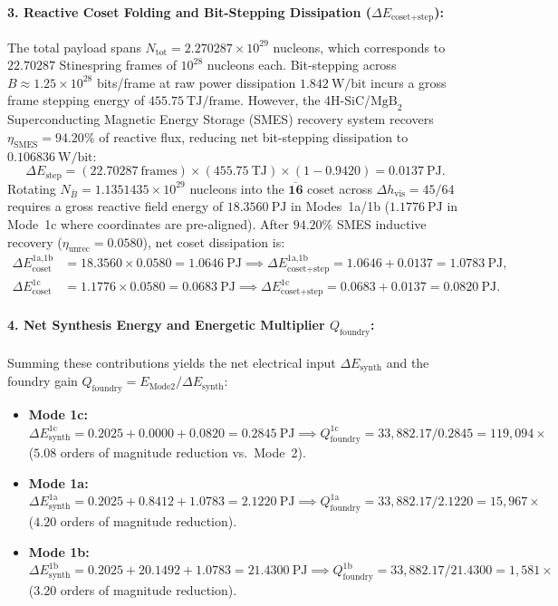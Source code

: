 \documentclass[11pt,onecolumn]{article}
\begin{document}
\paragraph{3. Reactive Coset Folding and Bit-Stepping Dissipation ($\Delta E_{\text{coset+step}}$):}
The total payload spans $N_{\text{tot}} = 2.270287\times 10^{29}$ nucleons, which corresponds to $22.70287$ Stinespring frames of $10^{28}$ nucleons each. Bit-stepping across $B \approx 1.25\times 10^{28}$ bits/frame at raw power dissipation $1.842~\text{W/bit}$ incurs a gross frame stepping energy of $455.75~\text{TJ/frame}$. However, the 4H-SiC/$\text{MgB}_2$ Superconducting Magnetic Energy Storage (SMES) recovery system recovers $\eta_{\text{SMES}} = 94.20\%$ of reactive flux, reducing net bit-stepping dissipation to $0.106836~\text{W/bit}$:
\begin{equation}
\Delta E_{\text{step}} = (22.70287~\text{frames})\times (455.75~\text{TJ})\times (1 - 0.9420) = 0.0137~\text{PJ}.
\end{equation}
Rotating $N_{\bar{B}} = 1.1351435\times 10^{29}$ nucleons into the $\overline{\mathbf{16}}$ coset across $\Delta h_{\text{vis}} = 45/64$ requires a gross reactive field energy of $18.3560~\text{PJ}$ in Modes~1a/1b ($1.1776~\text{PJ}$ in Mode~1c where coordinates are pre-aligned). After $94.20\%$ SMES inductive recovery ($\eta_{\text{unrec}} = 0.0580$), net coset dissipation is:
\begin{align}
\Delta E_{\text{coset}}^{\text{1a,1b}} &= 18.3560 \times 0.0580 = 1.0646~\text{PJ} \implies \Delta E_{\text{coset+step}}^{\text{1a,1b}} = 1.0646 + 0.0137 = 1.0783~\text{PJ}, \\
\Delta E_{\text{coset}}^{\text{1c}} &= 1.1776 \times 0.0580 = 0.0683~\text{PJ} \implies \Delta E_{\text{coset+step}}^{\text{1c}} = 0.0683 + 0.0137 = 0.0820~\text{PJ}.
\end{align}

\paragraph{4. Net Synthesis Energy and Energetic Multiplier $Q_{\text{foundry}}$:}
Summing these contributions yields the net electrical input $\Delta E_{\text{synth}}$ and the foundry gain $Q_{\text{foundry}} = E_{\text{Mode2}} / \Delta E_{\text{synth}}$:
\begin{itemize}
    \item \textbf{Mode 1c:} $\Delta E_{\text{synth}}^{\text{1c}} = 0.2025 + 0.0000 + 0.0820 = 0.2845~\text{PJ} \implies Q_{\text{foundry}}^{\text{1c}} = 33{,}882.17 / 0.2845 = 119{,}094\times$ ($5.08$ orders of magnitude reduction vs.\ Mode~2).
    \item \textbf{Mode 1a:} $\Delta E_{\text{synth}}^{\text{1a}} = 0.2025 + 0.8412 + 1.0783 = 2.1220~\text{PJ} \implies Q_{\text{foundry}}^{\text{1a}} = 33{,}882.17 / 2.1220 = 15{,}967\times$ ($4.20$ orders of magnitude reduction).
    \item \textbf{Mode 1b:} $\Delta E_{\text{synth}}^{\text{1b}} = 0.2025 + 20.1492 + 1.0783 = 21.4300~\text{PJ} \implies Q_{\text{foundry}}^{\text{1b}} = 33{,}882.17 / 21.4300 = 1{,}581\times$ ($3.20$ orders of magnitude reduction).
\end{itemize}
\end{document}
